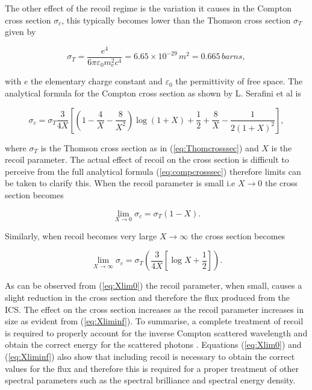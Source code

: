 \documentclass[11pt]{article}
\begin{document}
The other effect of the recoil regime is the variation it causes in the Compton cross section $\sigma_{c}$, this typically becomes lower than the Thomson cross section $\sigma_{T}$ given by

\begin{equation}
\sigma_{T} = \frac{e^{4}}{6\pi\varepsilon_{0}m_{e}^{2}c^{4}} = 6.65 \times 10^{-29}\, m^{2} = 0.665\, barns,
\label{eq:Thomcrosssec}
\end{equation}

\noindent with $e$ the elementary charge constant and $\varepsilon_{0}$ the permittivity of free space. The analytical formula for the Compton cross section as shown by L. Serafini et al \cite{SerafiniAnalytical} is

\begin{equation}
\sigma_{c} = \sigma_{T}\frac{3}{4X}\left[\left(1-\frac{4}{X}-\frac{8}{X^{2}}\right)\log\left(1+X\right)+\frac{1}{2}+\frac{8}{X}-\frac{1}{2\left(1+X\right)^{2}}\right],
\label{eq:compcrosssec}
\end{equation}

\noindent where $\sigma_{T}$ is the Thomson cross section as in (\ref{eq:Thomcrosssec}) and $X$ is the recoil parameter. The actual effect of recoil on the cross section is difficult to perceive from the full analytical formula (\ref{eq:compcrosssec}) therefore limits can be taken to clarify this. When the recoil parameter is small i.e $X \rightarrow 0$ the cross section becomes

\begin{equation}
\lim_{X \rightarrow 0} \sigma_{c} = \sigma_{T}\left(1-X\right).
\label{eq:Xlim0}
\end{equation}

\noindent Similarly, when recoil becomes very large $X \rightarrow \infty$ the cross section becomes 

\begin{equation}
\lim_{X \rightarrow \infty} \sigma_{c} = \sigma_{T}\left(\frac{3}{4X}\left[\log X + \frac{1}{2}\right]\right).
\label{eq:Xliminf}
\end{equation}

\noindent As can be observed from (\ref{eq:Xlim0}) the recoil parameter, when small, causes a slight reduction in the cross section and therefore the flux produced from the ICS. The effect on the cross section increases as the recoil parameter increases in size as evident from (\ref{eq:Xliminf}). To summarise, a complete treatment of recoil is required to properly account for the inverse Compton scattered wavelength and obtain the correct energy for the scattered photons \cite{KrafftLaserPulsing}. Equations (\ref{eq:Xlim0}) and (\ref{eq:Xliminf}) also show that including recoil is necessary to obtain the correct values for the flux and therefore this is required for a proper treatment of other spectral parameters such as the spectral brilliance and spectral energy density.   
\end{document}
